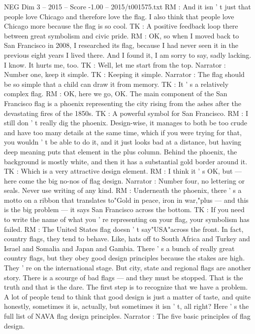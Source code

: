\begin{textsample}{NEG Dim 3 – 2015 – Score -1.00 – 2015/t001575.txt}
RM : And it isn ' t just that people love Chicago and therefore love the flag.
I also think that people love Chicago more because the flag is so cool.
TK : A positive feedback loop there between great symbolism and civic pride.
RM : OK, so when I moved back to San Francisco in 2008, I researched its flag, because I had never seen it in the previous eight years I lived there.
And I found it, I am sorry to say, sadly lacking.
I know.
It hurts me, too.
TK : Well, let me start from the top.
Narrator : Number one, keep it simple.
TK : Keeping it simple.
Narrator : The flag should be so simple that a child can draw it from memory.
TK : It ' s a relatively complex flag.
RM : OK, here we go, OK.
The main component of the San Francisco flag is a phoenix representing the city rising from the ashes after the devastating fires of the 1850s.
TK : A powerful symbol for San Francisco.
RM : I still don ' t really dig the phoenix.
Design-wise, it manages to both be too crude and have too many details at the same time, which if you were trying for that, you wouldn ' t be able to do it, and it just looks bad at a distance, but having deep meaning puts that element in the plus column.
Behind the phoenix, the background is mostly white, and then it has a substantial gold border around it.
TK : Which is a very attractive design element.
RM : I think it ' s OK, but — here come the big no-nos of flag design.
Narrator : Number four, no lettering or seals.
Never use writing of any kind.
RM : Underneath the phoenix, there ' s a motto on a ribbon that translates to"Gold in peace, iron in war,"plus — and this is the big problem — it says San Francisco across the bottom.
TK : If you need to write the name of what you ' re representing on your flag, your symbolism has failed.
RM : The United States flag doesn ' t say"USA"across the front.
In fact, country flags, they tend to behave.
Like, hats off to South Africa and Turkey and Israel and Somalia and Japan and Gambia.
There ' s a bunch of really great country flags, but they obey good design principles because the stakes are high.
They ' re on the international stage.
But city, state and regional flags are another story.
There is a scourge of bad flags — and they must be stopped.
That is the truth and that is the dare.
The first step is to recognize that we have a problem.
A lot of people tend to think that good design is just a matter of taste, and quite honestly, sometimes it is, actually, but sometimes it isn ' t, all right?
Here ' s the full list of NAVA flag design principles.
Narrator : The five basic principles of flag design.

\end{textsample}
